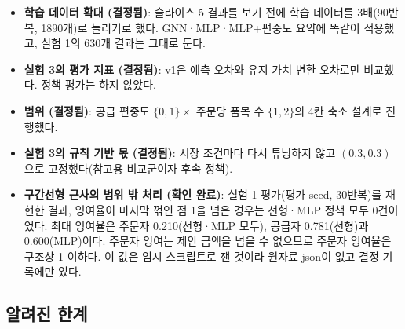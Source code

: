 \documentclass[11pt,a4paper]{article}
\begin{document}
\begin{itemize}[leftmargin=1.5em]
  \item \textbf{학습 데이터 확대 (결정됨)}: 슬라이스 5 결과를 보기 전에 학습 데이터를 3배(90반복, 1890개)로 늘리기로 했다.
        GNN·MLP·MLP+편중도 요약에 똑같이 적용했고, 실험 1의 630개 결과는 그대로 둔다.
  \item \textbf{실험 3의 평가 지표 (결정됨)}: v1은 예측 오차와 유지 가치 변환 오차로만 비교했다. 정책 평가는 하지 않았다.
  \item \textbf{범위 (결정됨)}: 공급 편중도 $\{0,1\}\times$ 주문당 품목 수 $\{1,2\}$의 4칸 축소 설계로 진행했다.
  \item \textbf{실험 3의 규칙 기반 몫 (결정됨)}: 시장 조건마다 다시 튜닝하지 않고 $(0.3,0.3)$으로 고정했다(참고용 비교군이자 후속 정책).
  \item \textbf{구간선형 근사의 범위 밖 처리 (확인 완료)}: 실험 1 평가(평가 seed, 30반복)를 재현한 결과,
        잉여율이 마지막 꺾인 점 1을 넘은 경우는 선형·MLP 정책 모두 0건이었다.
        최대 잉여율은 주문자 0.210(선형·MLP 모두), 공급자 0.781(선형)과 0.600(MLP)이다.
        주문자 잉여는 제안 금액을 넘을 수 없으므로 주문자 잉여율은 구조상 1 이하다. 이 값은 임시 스크립트로 잰 것이라 원자료 json이 없고 결정 기록에만 있다.
\end{itemize}

\subsection{알려진 한계}
\end{document}
